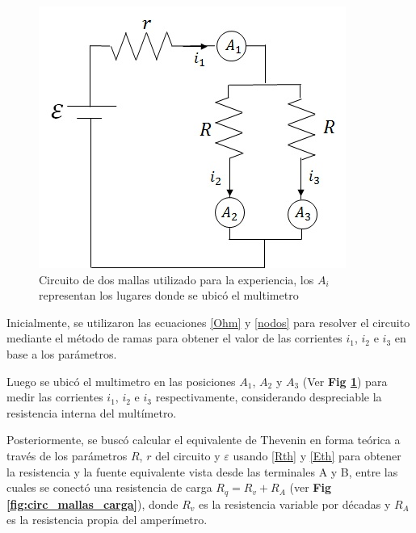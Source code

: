 \documentclass[11pt,a4paper]{article}
\begin{document}
\begin{figure}[h]
  \centering
  \includegraphics[scale=0.55]{Mallas_sin_carga}
  \caption{Circuito de dos mallas utilizado para la experiencia, los $A_i$ representan los lugares donde se ubicó el multimetro}
  \label{fig:circ_mallas}
\end{figure}

Inicialmente, se utilizaron las ecuaciones \eqref{Ohm} y \eqref{nodos} para resolver el circuito mediante el método de ramas para obtener el valor de las corrientes $i_1$, $i_2$ e $i_3$ en base a los parámetros. 
 
Luego se ubicó el multimetro en las posiciones $A_1$, $A_2$ y $A_3$ (Ver \textbf{Fig \ref{fig:circ_mallas}}) para medir las corrientes $i_1$, $i_2$ e $i_3$ respectivamente, considerando despreciable la resistencia interna del multímetro.
 
Posteriormente, se buscó calcular el equivalente de Thevenin en forma teórica a través de los parámetros $R$, $r$ del circuito y $\varepsilon$ usando \eqref{Rth} y \eqref{Eth} para obtener la resistencia y la fuente equivalente vista desde las terminales A y B, entre las cuales se conectó una resistencia de carga $R_q = R_v + R_A$ (ver \textbf{Fig \ref{fig:circ_mallas_carga}}), donde $R_v$ es la resistencia variable por décadas y $R_A$ es la resistencia propia del amperímetro. 
\end{document}
